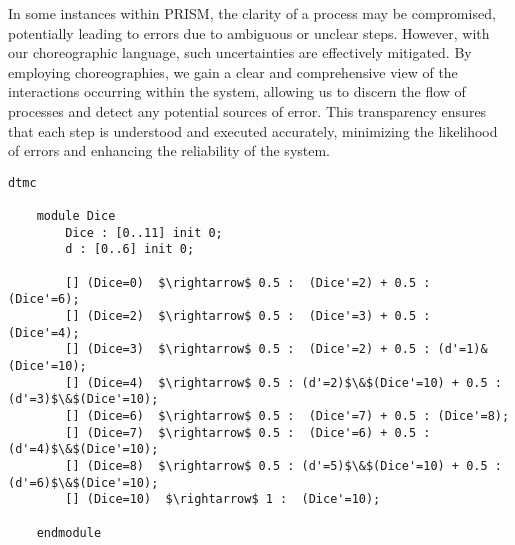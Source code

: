 
In some instances within PRISM, the clarity of a process may be compromised, potentially leading to errors due to ambiguous or unclear steps. However, with our choreographic language, such uncertainties are effectively mitigated. By employing choreographies, we gain a clear and comprehensive view of the interactions occurring within the system, allowing us to discern the flow of processes and detect any potential sources of error. This transparency ensures that each step is understood and executed accurately, minimizing the likelihood of errors and enhancing the reliability of the system.
\begin{lstlisting}[style=prism-color,caption={A PRISM example},captionpos=b,label={example1}]
    dtmc
    
    module Dice
        Dice : [0..11] init 0;
        d : [0..6] init 0; 
    
        [] (Dice=0)  $\rightarrow$ 0.5 :  (Dice'=2) + 0.5 :  (Dice'=6); 
        [] (Dice=2)  $\rightarrow$ 0.5 :  (Dice'=3) + 0.5 :  (Dice'=4); 
        [] (Dice=3)  $\rightarrow$ 0.5 :  (Dice'=2) + 0.5 : (d'=1)&(Dice'=10); 
        [] (Dice=4)  $\rightarrow$ 0.5 : (d'=2)$\&$(Dice'=10) + 0.5 : (d'=3)$\&$(Dice'=10);
        [] (Dice=6)  $\rightarrow$ 0.5 :  (Dice'=7) + 0.5 : (Dice'=8); 
        [] (Dice=7)  $\rightarrow$ 0.5 :  (Dice'=6) + 0.5 : (d'=4)$\&$(Dice'=10);
        [] (Dice=8)  $\rightarrow$ 0.5 : (d'=5)$\&$(Dice'=10) + 0.5 : (d'=6)$\&$(Dice'=10); 
        [] (Dice=10)  $\rightarrow$ 1 :  (Dice'=10);
    
    endmodule
        
    \end{lstlisting}
